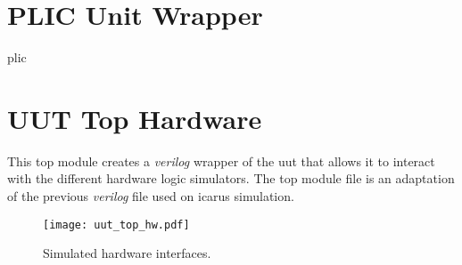 \section{PLIC Unit Wrapper}
\acrshort{plic} 

\section{UUT Top Hardware}
This top module creates a \textit{verilog} wrapper of the \acrfull{uut} that allows it to interact with the different hardware logic simulators. The top module file is an adaptation of the previous \textit{verilog} file used on icarus simulation.

\begin{figure}[!ht]
    \centering
    \texttt{[image: uut\_top\_hw.pdf]}
    \caption{Simulated hardware interfaces.}
    \label{fig:uut_top_hw}
\end{figure}